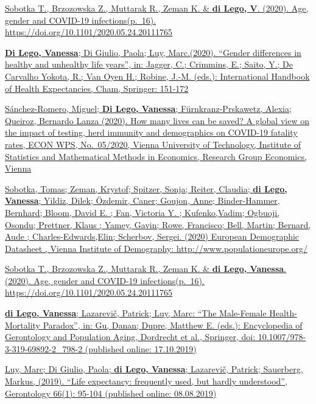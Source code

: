 \documentclass[
]{article}
\begin{document}
\href{https://www.medrxiv.org/content/10.1101/2020.05.24.20111765v1}{Sobotka
T., Brzozowska Z., Muttarak R., Zeman K. \& \textbf{di Lego, V}. (2020).
Age, gender and COVID-19 infections(p.~16).
https://doi.org/10.1101/2020.05.24.20111765}

\href{https://link.springer.com/chapter/10.1007\%2F978-3-030-37668-0_11}{\textbf{Di
Lego, Vanessa}; Di Giulio, Paola; Luy, Marc.(2020). ``Gender differences
in healthy and unhealthy life years'', in: Jagger, C.; Crimmins, E.;
Saito, Y.; De Carvalho Yokota, R.; Van Oyen H.; Robine, J.-M. (eds.):
International Handbook of Health Expectancies, Cham, Springer: 151-172}

\href{https://www.econstor.eu/bitstream/10419/218732/1/1698672055.pdf}{Sánchez-Romero,
Miguel; \textbf{Di Lego, Vanessa}; Fürnkranz-Prskawetz, Alexia; Queiroz,
Bernardo Lanza (2020). How many lives can be saved? A global view on the
impact of testing, herd immunity and demographics on COVID-19 fatality
rates, ECON WPS, No.~05/2020, Vienna University of Technology, Institute
of Statistics and Mathematical Methods in Economics, Research Group
Economics, Vienna}

\href{https://www.oeaw.ac.at/vid/data/demographic-data-sheets/european-demographic-data-sheet-2020}{Sobotka,
Tomas; Zeman, Krystof; Spitzer, Sonja; Reiter, Claudia; \textbf{di Lego,
Vanessa}; Yildiz, Dilek; Özdemir, Caner; Goujon, Anne; Binder-Hammer,
Bernhard; Bloom, David E. ; Fan, Victoria Y. ; Kufenko,Vadim; Ogbuoji,
Osondu; Prettner, Klaus ; Yamey, Gavin; Rowe, Francisco; Bell, Martin;
Bernard, Aude ; Charles-Edwards,Elin; Scherbov, Sergei. (2020) European
Demographic Datasheet , Vienna Institute of Demography:
http://www.populationeurope.org/}

\href{https://www.medrxiv.org/content/10.1101/2020.05.24.20111765v1}{Sobotka
T., Brzozowska Z., Muttarak R., Zeman K. \& \textbf{di Lego, Vanessa}.
(2020). Age, gender and COVID-19 infections(p.~16).
https://doi.org/10.1101/2020.05.24.20111765}

\href{https://link.springer.com/referenceworkentry/10.1007\%2F978-3-319-69892-2_798-2}{\textbf{di
Lego, Vanessa}; Lazarevič, Patrick; Luy, Marc: ``The Male-Female
Health-Mortality Paradox'', in: Gu, Danan; Dupre, Matthew E. (eds.):
Encyclopedia of Gerontology and Population Aging, Dordrecht et al.,
Springer, doi: 10.1007/978-3-319-69892-2\_798-2 (published online:
17.10.2019)}

\href{https://pubmed.ncbi.nlm.nih.gov/31390630/}{Luy, Marc; Di Giulio,
Paola; \textbf{di Lego, Vanessa}; Lazarevič, Patrick; Sauerberg, Markus,
(2019). ``Life expectancy: frequently used, but hardly understood'',
Gerontology 66(1): 95-104 (published online: 08.08.2019)}
\end{document}
